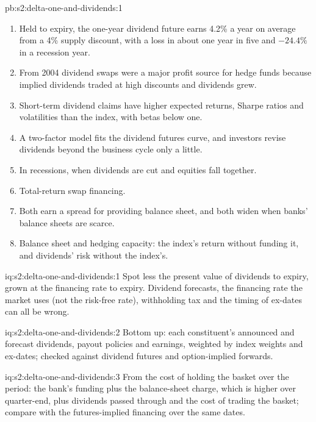 \begin{solution}{pb:s2:delta-one-and-dividends:1}
\begin{enumerate}
12.3\%, 5\% quantile $-25.5\%$, chance of a loss 20.9\%.
\item Held to expiry, the one-year dividend future earns 4.2\% a year on average from a 4\% supply discount, with a loss in about one year in five
and $-24.4\%$ in a recession year.
\item From 2004 dividend swaps were a major profit source for hedge funds because implied dividends traded at high discounts and dividends grew.
\item Short-term dividend claims have higher expected returns, Sharpe ratios and volatilities than the index, with betas below one.
\item A two-factor model fits the dividend futures curve, and investors revise dividends beyond the business cycle only a little.
\item In recessions, when dividends are cut and equities fall together.
\item Total-return swap financing.
\item Both earn a spread for providing balance sheet, and both widen when banks' balance sheets are scarce.
\item Balance sheet and hedging capacity: the index's return without funding it, and dividends' risk without the index's.
\end{enumerate}
\end{solution}

\begin{solution}{iq:s2:delta-one-and-dividends:1}
Spot less the present value of dividends to expiry, grown at the financing rate to expiry. Dividend forecasts, the financing rate the market uses
(not the risk-free rate), withholding tax and the timing of ex-dates can all be wrong.
\end{solution}

\begin{solution}{iq:s2:delta-one-and-dividends:2}
Bottom up: each constituent's announced and forecast dividends, payout policies and earnings, weighted by index weights and ex-dates; checked
against dividend futures and option-implied forwards.
\end{solution}

\begin{solution}{iq:s2:delta-one-and-dividends:3}
From the cost of holding the basket over the period: the bank's funding plus the balance-sheet charge, which is higher over quarter-end, plus
dividends passed through and the cost of trading the basket; compare with the futures-implied financing over the same dates.
\end{solution}

